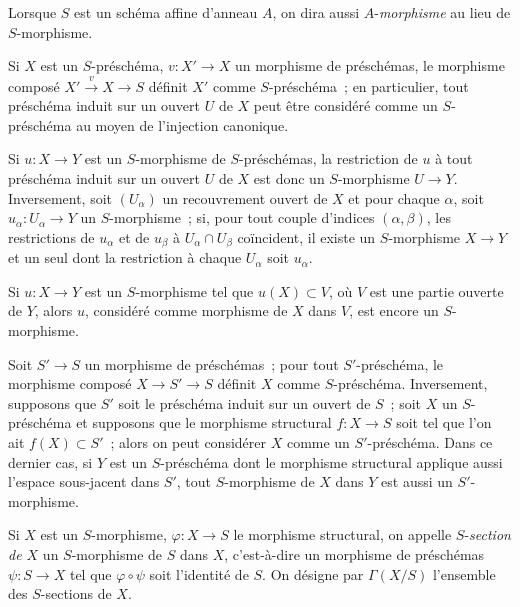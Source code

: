 Lorsque $S$ est un schéma affine d'anneau $A$, on dira aussi
$A$-\emph{morphisme} au lieu de $S$-morphisme.

\begin{env}[2.5.3]
\label{I.2.5.3-fr}
Si $X$ est un $S$-préschéma, $v:X'\to X$ un morphisme de préschémas, le
morphisme composé $X'\xrightarrow{v}X\to S$ définit $X'$ comme
$S$-préschéma~; en particulier, tout préschéma induit sur un ouvert $U$ de
$X$ peut être considéré comme un $S$-préschéma au moyen de l'injection
canonique.

Si $u:X\to Y$ est un $S$-morphisme de $S$-préschémas, la restriction de $u$
à tout préschéma induit sur un ouvert $U$ de $X$ est donc un $S$-morphisme
$U\to Y$. Inversement, soit $(U_\alpha)$ un recouvrement ouvert de $X$ et pour
chaque $\alpha$, soit $u_\alpha:U_\alpha\to Y$ un $S$-morphisme~; si, pour tout
couple d'indices $(\alpha,\beta)$, les restrictions de $u_\alpha$ et de
$u_\beta$ à $U_\alpha\cap U_\beta$ coïncident, il existe un $S$-morphisme
$X\to Y$ et un seul dont la restriction à chaque $U_\alpha$ soit $u_\alpha$.

Si $u:X\to Y$ est un $S$-morphisme tel que $u(X)\subset V$, où $V$ est une
partie ouverte de $Y$, alors $u$, considéré comme morphisme de $X$ dans $V$,
est encore un $S$-morphisme.
\end{env}

\begin{env}[2.5.4]
\label{I.2.5.4-fr}
Soit $S'\to S$ un morphisme de préschémas~; pour tout $S'$-préschéma, le
morphisme composé $X\to S'\to S$ définit $X$ comme $S$-préschéma.
Inversement, supposons que $S'$ soit le préschéma induit sur un ouvert de
$S$~; soit $X$ un $S$-préschéma et supposons que le morphisme structural
$f:X\to S$ soit tel que l'on ait $f(X)\subset S'$~; alors on peut considérer
$X$ comme un $S'$-préschéma. Dans ce dernier cas, si $Y$ est un $S$-préschéma
dont le morphisme structural applique aussi l'espace sous-jacent dans $S'$,
tout $S$-morphisme de $X$ dans $Y$ est aussi un $S'$-morphisme.
\end{env}

\begin{env}[2.5.5]
\label{I.2.5.5-fr}
Si $X$ est un $S$-morphisme, $\varphi:X\to S$ le morphisme structural, on
appelle $S$-\emph{section de $X$} un $S$-morphisme de $S$ dans $X$,
c'est-à-dire un morphisme de préschémas $\psi:S\to X$ tel que
$\varphi\circ\psi$ soit l'identité de $S$. On désigne par $\Gamma(X/S)$
l'ensemble des $S$-sections de $X$.
\end{env}
